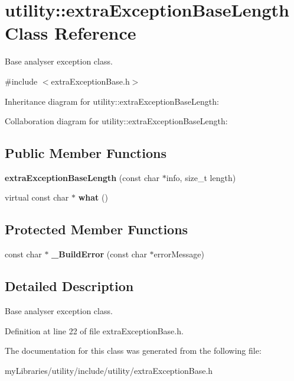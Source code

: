 \hypertarget{classutility_1_1extraExceptionBaseLength}{}\section{utility\+::extra\+Exception\+Base\+Length Class Reference}
\label{classutility_1_1extraExceptionBaseLength}


Base analyser exception class.  




{\ttfamily \#include $<$extra\+Exception\+Base.\+h$>$}



Inheritance diagram for utility\+::extra\+Exception\+Base\+Length\+:


Collaboration diagram for utility\+::extra\+Exception\+Base\+Length\+:
\subsection*{Public Member Functions}
\begin{DoxyCompactItemize}
\item 
\mbox{\label{classutility_1_1extraExceptionBaseLength_ab69cbbc4b695a515f944dc041f2c65f6}} 
{\bfseries extra\+Exception\+Base\+Length} (const char $\ast$info, size\+\_\+t length)
\item 
\mbox{\label{classutility_1_1extraExceptionBaseLength_ae62049889c7b63f2a7cbd62da2605204}} 
virtual const char $\ast$ {\bfseries what} ()
\end{DoxyCompactItemize}
\subsection*{Protected Member Functions}
\begin{DoxyCompactItemize}
\item 
\mbox{\label{classutility_1_1extraExceptionBaseLength_a33de8bc0560157126df0f477dd2730de}} 
const char $\ast$ {\bfseries \+\_\+\+Build\+Error} (const char $\ast$error\+Message)
\end{DoxyCompactItemize}


\subsection{Detailed Description}
Base analyser exception class. 

Definition at line 22 of file extra\+Exception\+Base.\+h.



The documentation for this class was generated from the following file\+:\begin{DoxyCompactItemize}
\item 
my\+Libraries/utility/include/utility/extra\+Exception\+Base.\+h\end{DoxyCompactItemize}
